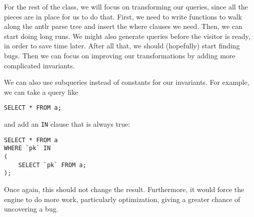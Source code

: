 \documentclass[conference]{acmsiggraph}
\begin{document}
For the rest of the class, we will focus on transforming our queries, since all the pieces are in place for us to do that. First, we need to write functions to walk along the antlr parse tree and insert the where clauses we need. Then, we can start doing long runs. We might also generate queries before the visitor is ready, in order to save time later. After all that, we should (hopefully) start finding bugs. Then we can focus on improving our transformations by adding more complicated invariants.

We can also use subqueries instead of constants for our invariants. For example, we can take a query like
\begin{verbatim}
SELECT * FROM a;
\end{verbatim}
and add an \texttt{IN} clause that is always true:
\begin{verbatim}
SELECT * FROM a 
WHERE `pk` IN 
(
    SELECT `pk` FROM a;
);
\end{verbatim}

Once again, this should not change the result. Furthermore, it would force the engine to do more work, particularly optimization, giving a greater chance of uncovering a bug.



\end{document}
